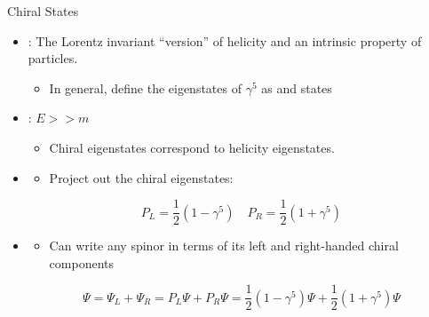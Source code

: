 \documentclass[aspectratio=169]{beamer}
\begin{document}
\begin{frame}{Chiral States}
  \begin{itemize}
    \item {}: The Lorentz invariant ``version'' of helicity and an intrinsic property of particles.
      \begin{itemize}
        \item In general, define the eigenstates of $\gamma^{5}$ as  and  states
      \end{itemize}
    \item {}:
      $E >> m$
      \begin{itemize}
        \item Chiral eigenstates correspond to helicity eigenstates.
      \end{itemize}
    \item {}
      \begin{itemize}
        \item Project out the chiral eigenstates:
      \end{itemize}
      $$
        \boxed{P_{L} = \frac{1}{2}\left(1 - \gamma^{5}\right) \quad P_{R} = \frac{1}{2}\left(1 + \gamma^{5}\right)}
      $$
    \item {}
      \begin{itemize}
        \item Can write any spinor in terms of its left and right-handed chiral components
      \end{itemize}
      $$
        \Psi = \Psi_{L} + \Psi_{R} = P_{L}\Psi + P_{R}\Psi = \frac{1}{2}\left(1 - \gamma^{5}\right)\Psi + \frac{1}{2}\left(1 + \gamma^{5}\right)\Psi
      $$
  \end{itemize}
\end{frame}
\end{document}
